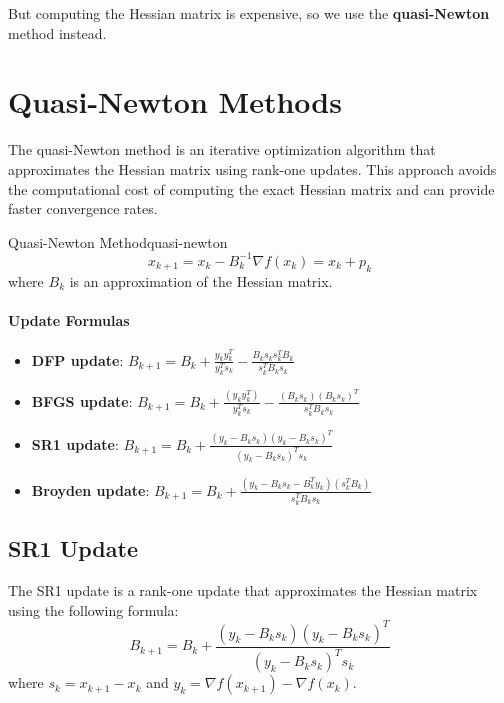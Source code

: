 But computing the Hessian matrix is expensive, so we use the \textbf{quasi-Newton} method instead.

\section*{Quasi-Newton Methods}
The quasi-Newton method is an iterative optimization algorithm that approximates the Hessian matrix using rank-one updates. 
This approach avoids the computational cost of computing the exact Hessian matrix and can provide faster convergence rates.
\begin{definition}{Quasi-Newton Method}{quasi-newton}
    \[
    x_{k+1} = x_k - B_k^{-1} \nabla f(x_k) = x_k + p_k
    \]
    where \( B_k \) is an approximation of the Hessian matrix.
\end{definition}

\begin{algorithm}[H]
    \caption{Quasi-Newton Method}
    \label{alg:quasi-newton}
    \;
    \;
\end{algorithm}

\paragraph{Update Formulas}

\begin{itemize}
    \item \textbf{DFP update}: \( B_{k+1} = B_k + \frac{y_k y_k^T}{y_k^T s_k} - \frac{B_k s_k s_k^T B_k}{s_k^T B_k s_k} \)
    \item \textbf{BFGS update}: \( B_{k+1} = B_k + \frac{(y_k y_k^T)}{y_k^T s_k} - \frac{(B_k s_k)(B_k s_k)^T}{s_k^T B_k s_k} \)
    \item \textbf{SR1 update}: \( B_{k+1} = B_k + \frac{(y_k - B_k s_k)(y_k - B_k s_k)^T}{(y_k - B_k s_k)^T s_k} \)
    \item \textbf{Broyden update}: \( B_{k+1} = B_k + \frac{(y_k - B_k s_k - B_k^T y_k)(s_k^T B_k)}{s_k^T B_k s_k} \)
\end{itemize}

\subsection*{SR1 Update}
The SR1 update is a rank-one update that approximates the Hessian matrix using the following formula:
\[
B_{k+1} = B_k + \frac{(y_k - B_k s_k)(y_k - B_k s_k)^T}{(y_k - B_k s_k)^T s_k}
\]
where \( s_k = x_{k+1} - x_k \) and \( y_k = \nabla f(x_{k+1}) - \nabla f(x_k) \).




